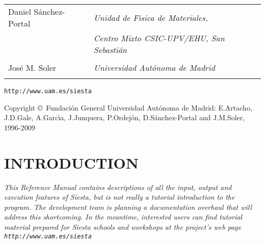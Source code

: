 \documentclass[11pt]{article}
\begin{document}
\begin{titlepage}
\begin{center}
{\begin{tabular}{ll}
{\Large Daniel S\'anchez-Portal} &
   \Large{\it Unidad de F\'{\i}sica de Materiales,} \\
                                 &
   \Large{\it Centro Mixto CSIC-UPV/EHU, San Sebasti\'an} \\ \\

{\Large Jos\'e M. Soler} &
   \Large{\it Universidad Aut\'onoma de Madrid} \\ \\

\end{tabular}
}

\vspace{0.5cm}
{\Large {\tt http://www.uam.es/siesta} }

\vspace{0.5cm}
Copyright \copyright\  Fundaci\'on General Universidad Aut\'onoma de Madrid:
E.Artacho, J.D.Gale, A.Garc\'{\i}a, J.Junquera, P.Ordej\'on,
D.S\'anchez-Portal and J.M.Soler, 1996-2009

\end{center}

\end{titlepage}


\newpage

\tableofcontents

\newpage

\section{INTRODUCTION}

{\it This Reference Manual contains descriptions of all the input,
  output and execution features of {\sc Siesta}, but is not really a
  tutorial introduction to the program. The development team is
  planning a documentation overhaul that will address this
  shortcoming. In the meantime, interested users can find tutorial
  material prepared for {\sc Siesta} schools and workshops at the
  project's web page {\tt http://www.uam.es/siesta}}
\end{document}
